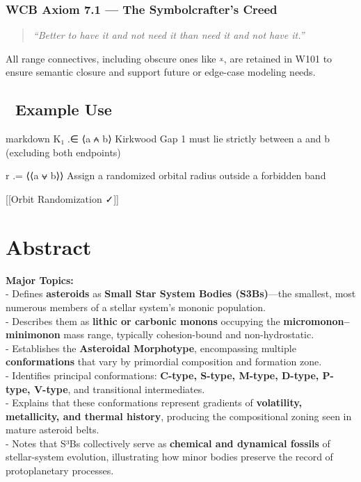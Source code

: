\documentclass[
  letterpaper,
]{book}
\begin{document}
\subsection{WCB Axiom 7.1 --- The Symbolcrafter's
Creed}\label{wcb-axiom-7.1-the-symbolcrafters-creed}

\begin{quote}
\emph{``Better to have it and not need it than need it and not have
it.''}
\end{quote}

All range connectives, including obscure ones like \texttt{⩡}, are
retained in W101 to ensure semantic closure and support future or
edge-case modeling needs.

\section{🌌 Example Use}\label{example-use}

markdown K₁ .∈ ⟨a ⩜ b⟩ Kirkwood Gap 1 must lie strictly between a and b
(excluding both endpoints)

r .= ⟨⟨a ⩝ b⟩⟩ Assign a randomized orbital radius outside a forbidden
band

{[}{[}Orbit Randomization ✓{]}{]}

\chapter{Abstract}\label{abstract-42}

\textbf{Major Topics:}\\
- Defines \textbf{asteroids} as \textbf{Small Star System Bodies
(S3Bs)}---the smallest, most numerous members of a stellar system's
mononic population.\\
- Describes them as \textbf{lithic or carbonic monons} occupying the
\textbf{micromonon--minimonon} mass range, typically cohesion-bound and
non-hydrostatic.\\
- Establishes the \textbf{Asteroidal Morphotype}, encompassing multiple
\textbf{conformations} that vary by primordial composition and formation
zone.\\
- Identifies principal conformations: \textbf{C-type, S-type, M-type,
D-type, P-type, V-type}, and transitional intermediates.\\
- Explains that these conformations represent gradients of
\textbf{volatility, metallicity, and thermal history}, producing the
compositional zoning seen in mature asteroid belts.\\
- Notes that S³Bs collectively serve as \textbf{chemical and dynamical
fossils} of stellar-system evolution, illustrating how minor bodies
preserve the record of protoplanetary processes.
\end{document}
